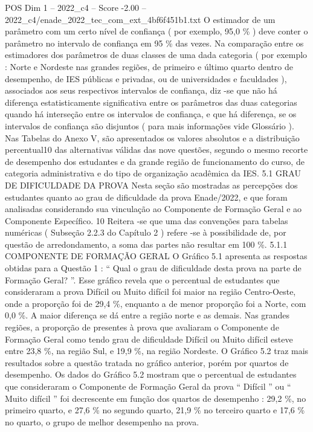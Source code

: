 \begin{textsample}{POS Dim 1 – 2022\_c4 – Score -2.00 – 2022\_c4/enade\_2022\_tec\_com\_ext\_4bf6f451b1.txt}
O estimador de um parâmetro com um certo nível de confiança ( por exemplo, 95,0 \% ) deve conter o parâmetro no intervalo de confiança em 95 \% das vezes.
Na comparação entre os estimadores dos parâmetros de duas classes de uma dada categoria ( por exemplo : Norte e Nordeste nas grandes regiões, de primeiro e último quarto dentro de desempenho, de IES públicas e privadas, ou de universidades e faculdades ), associados aos seus respectivos intervalos de confiança, diz -se que não há diferença estatisticamente significativa entre os parâmetros das duas categorias quando há interseção entre os intervalos de confiança, e que há diferença, se os intervalos de confiança são disjuntos ( para mais informações vide Glossário ).
Nas Tabelas do Anexo V, são apresentados os valores absolutos e a distribuição percentual10 das alternativas válidas das nove questões, segundo o mesmo recorte de desempenho dos estudantes e da grande região de funcionamento do curso, de categoria administrativa e do tipo de organização acadêmica da IES. 5.1 GRAU DE DIFICULDADE DA PROVA Nesta seção são mostradas as percepções dos estudantes quanto ao grau de dificuldade da prova Enade/2022, e que foram analisadas considerando sua vinculação ao Componente de Formação Geral e ao Componente Específico. 10 Reitera -se que uma das convenções para tabelas numéricas ( Subseção 2.2.3 do Capítulo 2 ) refere -se à possibilidade de, por questão de arredondamento, a soma das partes não resultar em 100 \%. 5.1.1 COMPONENTE DE FORMAÇÃO GERAL O Gráfico 5.1 apresenta as respostas obtidas para a Questão 1 : “ Qual o grau de dificuldade desta prova na parte de Formação Geral? ”.
Esse gráfico revela que o percentual de estudantes que consideraram a prova Difícil ou Muito difícil foi maior na região Centro-Oeste, onde a proporção foi de 29,4 \%, enquanto a de menor proporção foi a Norte, com 0,0 \%.
A maior diferença se dá entre a região norte e as demais.
Nas grandes regiões, a proporção de presentes à prova que avaliaram o Componente de Formação Geral como tendo grau de dificuldade Difícil ou Muito difícil esteve entre 23,8 \%, na região Sul, e 19,9 \%, na região Nordeste.
O Gráfico 5.2 traz mais resultados sobre a questão tratada no gráfico anterior, porém por quartos de desempenho.
Os dados do Gráfico 5.2 mostram que o percentual de estudantes que consideraram o Componente de Formação Geral da prova “ Difícil ” ou “ Muito difícil ” foi decrescente em função dos quartos de desempenho : 29,2 \%, no primeiro quarto, e 27,6 \% no segundo quarto, 21,9 \% no terceiro quarto e 17,6 \% no quarto, o grupo de melhor desempenho na prova.

\end{textsample}
